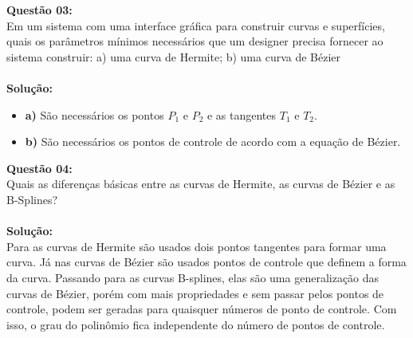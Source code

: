 \documentclass[a4paper, 12pt]{article}
\begin{document}
\vspace{1 cm}
\noindent\textbf{Questão 03:}\\
Em um sistema com uma interface gráfica para construir curvas e superfícies, quais os parâmetros
mínimos necessários que um designer precisa fornecer ao sistema construir: a) uma curva de
Hermite; b) uma curva de Bézier\\
\\
\noindent\textbf{Solução:}
\begin{itemize}
    \item\textbf{a)} São necessários os pontos $P_1$ e $P_2$ e as tangentes $T_1$ e $T_2$.
    \item\textbf{b)} São necessários os pontos de controle de acordo com a equação de Bézier.
\end{itemize}

\vspace{1cm}
\noindent\textbf{Questão 04:}\\
Quais as diferenças básicas entre as curvas de Hermite, as curvas de Bézier e as B-Splines?\\
\\
\noindent\textbf{Solução:}
\\
Para as curvas de Hermite são usados dois pontos tangentes para formar uma curva. Já nas curvas de Bézier são usados pontos de controle que definem a forma da curva. Passando para as curvas B-splines, elas são uma generalização das curvas de Bézier, porém com mais propriedades e sem passar pelos pontos de controle, podem ser geradas para quaisquer números de ponto de controle. Com isso, o grau do polinômio fica independente do número de pontos de controle.
\end{document}
